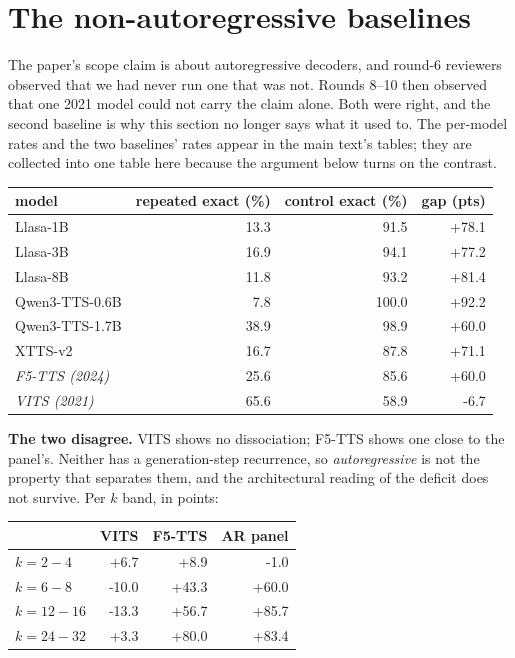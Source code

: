 \documentclass[11pt]{article}
\begin{document}
\section{The non-autoregressive baselines}
\label{sec:s13}

The paper's scope claim is about autoregressive decoders, and round-6 reviewers
observed that we had never run one that was not. Rounds 8--10 then observed that
one 2021 model could not carry the claim alone. Both were right, and the second
baseline is why this section no longer says what it used to. The per-model
rates and the two baselines' rates appear in the main text's tables; they are
collected into one table here because the argument below turns on the contrast.

\begin{center}
\begin{tabular}{lrrr}
\toprule
model & repeated exact (\%) & control exact (\%) & gap (pts) \\
\midrule
Llasa-1B & 13.3 & 91.5 & +78.1 \\
Llasa-3B & 16.9 & 94.1 & +77.2 \\
Llasa-8B & 11.8 & 93.2 & +81.4 \\
Qwen3-TTS-0.6B & 7.8 & 100.0 & +92.2 \\
Qwen3-TTS-1.7B & 38.9 & 98.9 & +60.0 \\
XTTS-v2 & 16.7 & 87.8 & +71.1 \\
\midrule
\emph{F5-TTS (2024)} & 25.6 & 85.6 & +60.0 \\
\emph{VITS (2021)} & 65.6 & 58.9 & -6.7 \\
\bottomrule
\end{tabular}
\end{center}

\noindent\textbf{The two disagree.} VITS shows no dissociation; F5-TTS shows one
close to the panel's. Neither has a generation-step recurrence, so
\emph{autoregressive} is not the property that separates them, and the
architectural reading of the deficit does not survive. Per $k$ band, in points:

\begin{center}
\begin{tabular}{lrrr}
\toprule
 & VITS & F5-TTS & AR panel \\
\midrule
$k=2-4$ & +6.7 & +8.9 & -1.0 \\
$k=6-8$ & -10.0 & +43.3 & +60.0 \\
$k=12-16$ & -13.3 & +56.7 & +85.7 \\
$k=24-32$ & +3.3 & +80.0 & +83.4 \\
\bottomrule
\end{tabular}
\end{center}
\end{document}
